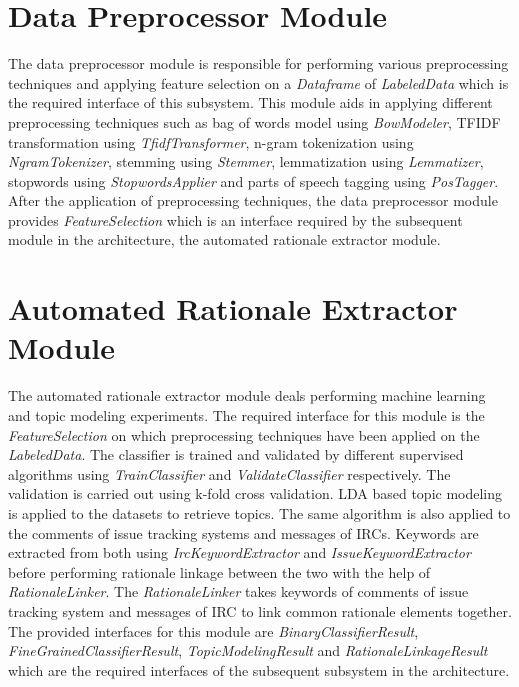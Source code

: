 \documentclass[a4paper,12pt,twoside]{report}
\begin{document}
\section{Data Preprocessor Module}
The data preprocessor module is responsible for performing various preprocessing techniques and applying feature selection on a \textit{Dataframe} of \textit{LabeledData} which is the required interface of this subsystem. This module aids in applying different preprocessing techniques such as bag of words model using \textit{BowModeler}, \acs{TFIDF} transformation using \textit{TfidfTransformer}, n-gram tokenization using \textit{NgramTokenizer}, stemming using \textit{Stemmer}, lemmatization using \textit{Lemmatizer}, stopwords using \textit{StopwordsApplier} and parts of speech tagging using \textit{PosTagger}. After the application of preprocessing techniques, the data preprocessor module provides \textit{FeatureSelection} which is an interface required by the subsequent module in the architecture, the automated rationale extractor module. 

\section{Automated Rationale Extractor Module}
The automated rationale extractor module deals performing machine learning and topic modeling experiments. The required interface for this module is the \textit{FeatureSelection} on which preprocessing techniques have been applied on the \textit{LabeledData}. The classifier is trained and validated by different supervised algorithms using \textit{TrainClassifier} and \textit{ValidateClassifier} respectively. The validation is carried out using k-fold cross validation. \acs{LDA} based topic modeling is applied to the datasets to retrieve topics. The same algorithm is also applied to the comments of issue tracking systems and messages of \acs{IRC}s. Keywords are extracted from both using \textit{IrcKeywordExtractor} and \textit{IssueKeywordExtractor} before performing rationale linkage between the two with the help of \textit{RationaleLinker}. The \textit{RationaleLinker} takes keywords of comments of issue tracking system and messages of \acs{IRC} to link common rationale elements together. The provided interfaces for this module are \textit{BinaryClassifierResult}, \textit{FineGrainedClassifierResult}, \textit{TopicModelingResult} and \textit{RationaleLinkageResult} which are the required interfaces of the subsequent subsystem in the architecture. 
\end{document}
